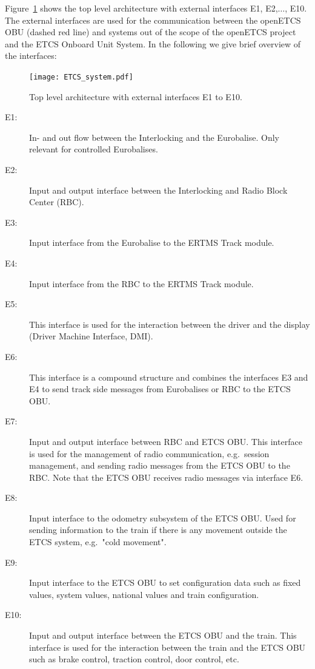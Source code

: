 Figure~\ref{f:top_level} shows the top level architecture with external interfaces E1, E2,$\ldots$, E10. The external interfaces are used for the communication between the openETCS OBU (dashed red line) and systems out of the scope of the openETCS project and the ETCS Onboard Unit System. In the following we give  brief overview of the interfaces:
\begin{figure}
\centering
\texttt{[image: ETCS\_system.pdf]}
\caption{Top level architecture with external interfaces E1 to E10.}
\label{f:top_level}
\end{figure}

\begin{description}
\item[E1:] In- and out flow between the Interlocking and the Eurobalise. Only relevant for controlled Eurobalises.

\item[E2:] Input and output interface between the Interlocking and Radio Block Center (RBC).

\item[E3:] Input interface from the Eurobalise to the ERTMS Track module.

\item[E4:] Input interface from the RBC to the ERTMS Track module.

\item[E5:] This interface is used for the interaction between the driver and the display (Driver Machine Interface, DMI).

\item[E6:] This interface is a compound structure and combines the interfaces E3 and E4 to send track side messages from Eurobalises or RBC to the ETCS OBU.

\item[E7:] Input and output interface between RBC and ETCS OBU. This interface is used for the management of radio communication, e.g.~session management, and sending radio messages from the ETCS OBU to the RBC. Note that the ETCS OBU receives radio messages via interface E6.

\item[E8:] Input interface to the odometry subsystem of the ETCS OBU. Used for sending information to the train if there is any movement outside the ETCS system, e.g.~"cold movement".

\item[E9:] Input interface to the ETCS OBU to set configuration data such as fixed values, system values, national values and train configuration.

\item[E10:] Input and output interface between the ETCS OBU and the train. This interface is used for the interaction between the train and the ETCS OBU such as brake control, traction control, door control, etc.

\end{description}


